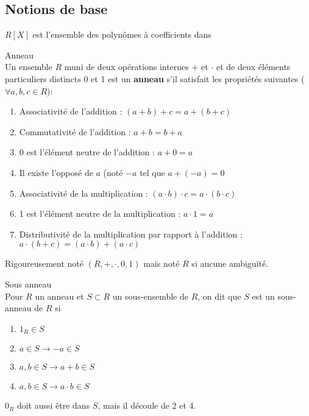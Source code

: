 \documentclass[12pt,a4paper]{article}
\begin{document}
\subsection{Notions de base}
$R[X]$ est l'ensemble des polynômes à coefficients dans \R
\begin{boite}
     Anneau\\
     Un ensemble $R$ muni de deux opérations internes $+$ et $\cdot$ et de deux éléments particuliers distincts 0 et 1 est un \textbf{anneau} s'il satisfait les propriétés suivantes ($\forall a,b,c \in R$):
    \begin{enumerate}[label=(\roman{*})]
        \item Associativité de l'addition : $(a+b)+c = a+(b+c)$
        \item Commutativité de l'addition : $a+b = b+a$
        \item 0 est l'élément neutre de l'addition : $a+0 = a$
        \item Il existe l'opposé de $a$ (noté $-a$ tel que $a+(-a) = 0$
        \item Associativité de la multiplication : $(a\cdot b) \cdot c = a \cdot (b \cdot c)$
        \item 1 est l'élément neutre de la multiplication : $a\cdot 1 = a$
        \item Distributivité de la multiplication par rapport à l'addition : $a\cdot (b+c) = (a\cdot b) + (a\cdot c)$
    \end{enumerate}
    Rigoureusement noté $(R, +, \cdot, 0, 1)$ mais noté $R$ si aucune ambiguïté.
\end{boite}
\begin{boite}
     Sous anneau\\
    Pour $R$ un anneau et $S \subset R$ un sous-ensemble de $R$, on dit que $S$ est un sous-anneau de $R$ si 
    
    \begin{multicols}{2}
        \begin{enumerate}[label=(\roman{*})]
            \item $1_R \in S$
            \item $a \in S \to -a \in S$
            \item $a,b \in S \to a+b \in S$
            \item $a,b \in S \to a\cdot b \in S$
        \end{enumerate}
    \end{multicols}
    $0_R$ doit aussi être dans $S$, mais il découle de 2 et 4.
\end{boite}
\end{document}
